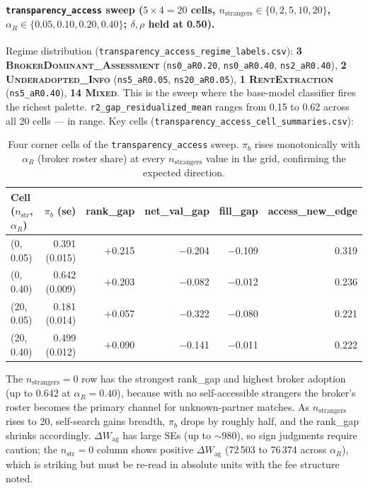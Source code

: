 \documentclass[11pt,a4paper]{article}
\begin{document}
\paragraph{\texttt{transparency\_access} sweep ($5\times 4 = 20$ cells, $n_{\text{strangers}}\in\{0,2,5,10,20\}$, $\alpha_R\in\{0.05,0.10,0.20,0.40\}$; $\delta,\rho$ held at 0.50).} Regime distribution (\texttt{transparency\_access\_regime\_labels.csv}): \textbf{3 \textsc{BrokerDominant\_Assessment}} (\texttt{ns0\_aR0.20}, \texttt{ns0\_aR0.40}, \texttt{ns2\_aR0.40}), \textbf{2 \textsc{Underadopted\_Info}} (\texttt{ns5\_aR0.05}, \texttt{ns20\_aR0.05}), \textbf{1 \textsc{RentExtraction}} (\texttt{ns5\_aR0.40}), \textbf{14 \textsc{Mixed}}. This is the sweep where the base-model classifier fires the richest palette. \texttt{r2\_gap\_residualized\_mean} ranges from 0.15 to 0.62 across all 20 cells --- in range. Key cells (\texttt{transparency\_access\_cell\_summaries.csv}):
\begin{table}[h]\centering\small
\caption{Four corner cells of the \texttt{transparency\_access} sweep. $\pi_b$ rises monotonically with $\alpha_R$ (broker roster share) at every $n_{\text{strangers}}$ value in the grid, confirming the expected direction.}
\label{tab:c3_ta}
\begin{tabular}{@{}lrrrrr@{}}
\toprule
Cell ($n_{\text{str}}$, $\alpha_R$) & $\pi_b$ (se) & rank\_gap & net\_val\_gap & fill\_gap & access\_new\_edge \\
\midrule
(0, 0.05)   & 0.391 (0.015) & $+$0.215 & $-$0.204 & $-$0.109 & 0.319 \\
(0, 0.40)   & 0.642 (0.009) & $+$0.203 & $-$0.082 & $-$0.012 & 0.236 \\
(20, 0.05)  & 0.181 (0.014) & $+$0.057 & $-$0.322 & $-$0.080 & 0.221 \\
(20, 0.40)  & 0.499 (0.012) & $+$0.090 & $-$0.141 & $-$0.011 & 0.222 \\
\bottomrule
\end{tabular}
\end{table}

The $n_{\text{strangers}}{=}0$ row has the strongest rank\_gap and highest broker adoption (up to 0.642 at $\alpha_R{=}0.40$), because with no self-accessible strangers the broker's roster becomes the primary channel for unknown-partner matches. As $n_{\text{strangers}}$ rises to 20, self-search gains breadth, $\pi_b$ drops by roughly half, and the rank\_gap shrinks accordingly. $\Delta W_{\text{ag}}$ has large SEs (up to $\sim$980), so sign judgments require caution; the $n_{\text{str}}{=}0$ column shows positive $\Delta W_{\text{ag}}$ (72\,503 to 76\,374 across $\alpha_R$), which is striking but must be re-read in absolute units with the fee structure noted.
\end{document}
